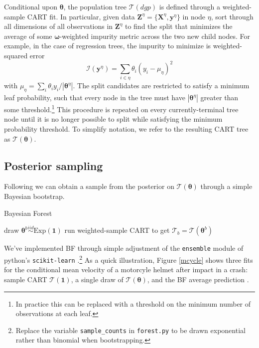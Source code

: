 \documentclass{article}
\begin{document}
Conditional upon $\boldsymbol{\theta}$, the population tree
$\mathcal{T}(dgp)$ is defined through a weighted-sample
CART fit. In particular, given data
$\mathbf{Z}^\eta = \{\mathbf{X}^\eta,\mathbf{y}^\eta\}$ in node $\eta$,
sort through all dimensions of all observations in $\mathbf{Z}^\eta$ to
find the split that minimizes the average of some $\boldsymbol{\omega}$-weighted
impurity metric across the two new child nodes. For example, in the case
of regression trees, the impurity to minimize is
weighted-squared error
\begin{equation}
\mathcal{I}(\mathbf{y}^\eta) = \sum_{i\in \eta} \theta_i (y_i - \mu_\eta )^2
\end{equation}
with $\mu_\eta = \sum_i \theta_i y_i/|\boldsymbol{\theta}^\eta|$. The split
candidates are restricted to satisfy a minimum leaf probability, such that
every node in the tree must have  $|\boldsymbol{\theta}^\eta|$ greater than
some threshold.\footnote{In practice this can be replaced with a threshold on
the minimum number of observations at each leaf.}   This  procedure is
repeated on every currently-terminal tree node until it is no longer possible
to split while satisfying the minimum probability threshold. To simplify
notation, we refer to the resulting CART tree as
$\mathcal{T}(\boldsymbol{\theta})$.




\subsection{Posterior sampling}\label{posterior-sampling}



Following \cite{rubin_bayesian_1981} we can obtain a sample from the
posterior on $\mathcal{T}(\boldsymbol{\theta})$ through a simple
Bayesian bootstrap. 
\begin{algorithm}[h]
   \caption{Bayesian Forest}
   \label{alg:bf}
\begin{algorithmic}
   \STATE draw $\boldsymbol{\theta}^b \stackrel{iid}{\sim} \mathrm{Exp}(\mathbf{1})$
   \STATE run weighted-sample CART to get $\mathcal{T}_b = \mathcal{T}(\boldsymbol{\theta}^b)$
   \ENDFOR
\end{algorithmic}
\end{algorithm}

   We've implemented  BF through simple adjustment of the
\texttt{ensemble} module of python's \texttt{scikit-learn} \citep{scikit-learn}.\footnote{Replace the variable \texttt{sample\_counts} in \texttt{forest.py}  to be
drawn exponential rather than binomial when bootstrapping.}  As a quick illustration, Figure \ref{mcycle} shows three fits for the conditional mean  velocity of a motorcyle helmet after  impact in a crash: sample CART $\mathcal{T}(\mathbf{1})$, a single draw of $\mathcal{T}(\boldsymbol{\theta})$, and the BF average prediction \citep[data are from the MASS R package,][]{mass}.
\end{document}
